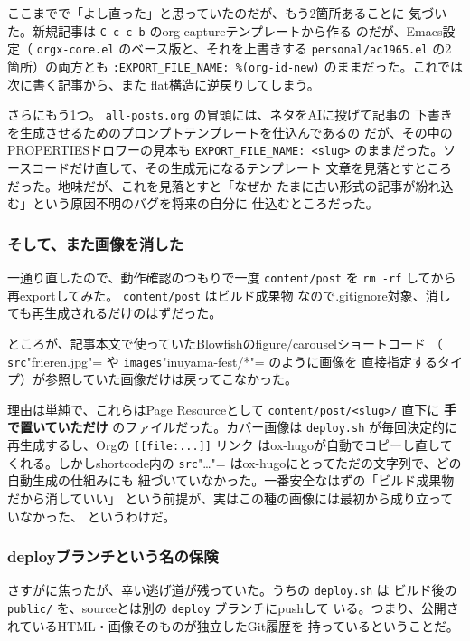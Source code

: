 \documentclass[11pt]{article}
\begin{document}
ここまでで「よし直った」と思っていたのだが、もう2箇所あることに
気づいた。新規記事は \texttt{C-c c b} のorg-captureテンプレートから作る
のだが、Emacs設定（ \texttt{orgx-core.el} のベース版と、それを上書きする
\texttt{personal/ac1965.el} の2箇所）の両方とも \texttt{:EXPORT\_FILE\_NAME:
\%(org-id-new)} のままだった。これでは次に書く記事から、また
flat構造に逆戻りしてしまう。

さらにもう1つ。 \texttt{all-posts.org} の冒頭には、ネタをAIに投げて記事の
下書きを生成させるためのプロンプトテンプレートを仕込んであるの
だが、その中のPROPERTIESドロワーの見本も \texttt{EXPORT\_FILE\_NAME: <slug>}
のままだった。ソースコードだけ直して、その生成元になるテンプレート
文章を見落とすところだった。地味だが、これを見落とすと「なぜか
たまに古い形式の記事が紛れ込む」という原因不明のバグを将来の自分に
仕込むところだった。
\subsubsection{そして、また画像を消した}
\label{sec:org3dec7d2}

一通り直したので、動作確認のつもりで一度 \texttt{content/post} を
\texttt{rm -rf} してから再exportしてみた。 \texttt{content/post} はビルド成果物
なので.gitignore対象、消しても再生成されるだけのはずだった。

ところが、記事本文で使っていたBlowfishのfigure/carouselショートコード
（ \texttt{src}"frieren.jpg"= や \texttt{images}"inuyama-fest/*"= のように画像を
直接指定するタイプ）が参照していた画像だけは戻ってこなかった。

理由は単純で、これらはPage Resourceとして \texttt{content/post/<slug>/}
直下に \textbf{手で置いていただけ} のファイルだった。カバー画像は
\texttt{deploy.sh} が毎回決定的に再生成するし、Orgの \texttt{[[file:...]]} リンク
はox-hugoが自動でコピーし直してくれる。しかしshortcode内の
\texttt{src}"\ldots{}"= はox-hugoにとってただの文字列で、どの自動生成の仕組みにも
紐づいていなかった。一番安全なはずの「ビルド成果物だから消していい」
という前提が、実はこの種の画像には最初から成り立っていなかった、
というわけだ。
\subsubsection{deployブランチという名の保険}
\label{sec:org4fead5c}

さすがに焦ったが、幸い逃げ道が残っていた。うちの \texttt{deploy.sh} は
ビルド後の \texttt{public/} を、sourceとは別の \texttt{deploy} ブランチにpushして
いる。つまり、公開されているHTML・画像そのものが独立したGit履歴を
持っているということだ。
\end{document}
